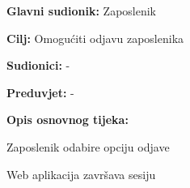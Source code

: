				
						\noindent {}
					\begin{packed_item}
						
						\item \textbf{Glavni sudionik:} Zaposlenik
						\item  \textbf{Cilj:} Omogućiti odjavu zaposlenika
						\item  \textbf{Sudionici:} -
						\item  \textbf{Preduvjet:} -
						\item  \textbf{Opis osnovnog tijeka:}
						
						\item[] \begin{packed_enum}
							
							\item Zaposlenik odabire opciju odjave
							\item Web aplikacija završava sesiju
							
						\end{packed_enum}
						
					\end{packed_item}

